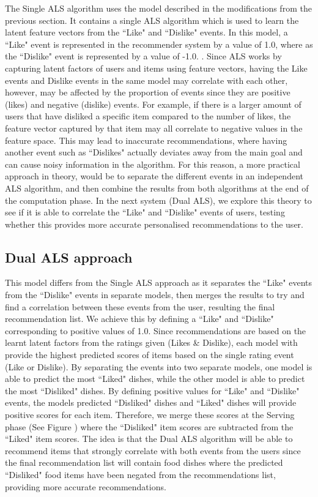 
The Single ALS algorithm uses the model described in the modifications from the previous section. It contains a single ALS algorithm which is used to learn the latent feature vectors from the ``Like" and ``Dislike" events. In this model, a ``Like" event is represented in the recommender system by a value of 1.0, where as the ``Dislike" event is represented by a value of -1.0. . Since ALS works by capturing latent factors of users and items using feature vectors, having the Like events and Dislike events in the same model may correlate with each other, however, may be affected by the proportion of events since they are positive (likes) and negative (dislike) events. For example, if there is a larger amount of users that have disliked a specific item compared to the number of likes, the feature vector captured by that item may all correlate to negative values in the feature space. This may lead to inaccurate recommendations, where having another event such as ``Dislikes" actually deviates away from the main goal and can cause noisy information in the algorithm. For this reason, a more practical approach in theory, would be to separate the different events in an independent ALS algorithm, and then combine the results from both algorithms at the end of the computation phase. In the next system (Dual ALS), we explore this theory to see if it is able to correlate the ``Like" and ``Dislike" events of users, testing whether this provides more accurate personalised recommendations to the user. 

\subsection{Dual ALS approach} 

This model differs from the Single ALS approach as it separates the ``Like" events from the ``Dislike" events in separate models, then merges the results to try and find a correlation between these events from the user, resulting the final recommendation list. We achieve this by defining a ``Like" and ``Dislike" corresponding to positive values of 1.0. Since recommendations are based on the learnt latent factors from the ratings given (Likes \& Dislike), each model with provide the highest predicted scores of items based on the single rating event (Like or Dislike). By separating the events into two separate models, one model is able to predict the most ``Liked" dishes, while the other model is able to predict the most ``Disliked" dishes. By defining positive values for ``Like" and ``Dislike" events, the models predicted ``Disliked" dishes and ``Liked" dishes will provide positive scores for each item. Therefore, we merge these scores at the Serving phase (See Figure ) where the ``Disliked" item scores are subtracted from the ``Liked" item scores. The idea is that the Dual ALS algorithm will be able to recommend items that strongly correlate with both events from the users since the final recommendation list will contain food dishes where the predicted ``Disliked" food items have been negated from the recommendations list, providing more accurate recommendations.

